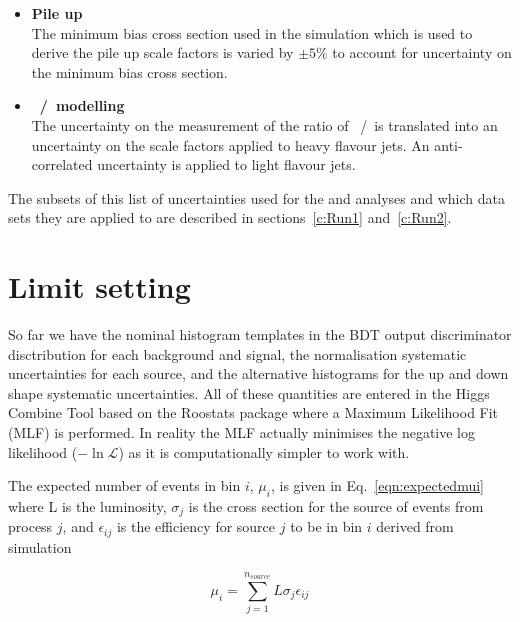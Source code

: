 \begin{itemize}
\item \textbf{Pile up}\\
The minimum bias cross section used in the simulation which is used to derive the pile up scale factors is varied by $\pm 5\%$ to account for uncertainty on the minimum bias cross section. 

\item \textbf{\heavyflavourone~/~\heavyflavourtwo modelling}\\
The uncertainty on the measurement of the ratio of \heavyflavourone~/~\heavyflavourtwo is translated into an uncertainty on the scale factors applied to heavy flavour jets. An anti-correlated uncertainty is applied to light flavour jets.

\end{itemize}

The subsets of this list of uncertainties used for the \runone and \runtwo analyses and which data sets they are applied to are described in sections~\ref{c:Run1} and~\ref{c:Run2}. 


\section{Limit setting \label{sec:limitFit}}
So far we have the nominal histogram templates in the BDT output discriminator disctribution for each background and signal, the normalisation systematic uncertainties for each source, and the alternative histograms for the up and down shape systematic uncertainties. All of these quantities are entered in the Higgs Combine Tool based on the Roostats package where a Maximum Likelihood Fit (MLF) is performed. In reality the MLF actually minimises the negative log likelihood ($-\ln\mathcal{L}$) as it is computationally simpler to work with.

The expected number of events in bin $i$, $\mu_{i}$, is given in Eq.~\ref{eqn:expectedmui} where L is the luminosity, $\sigma_{j}$ is the cross section for the source of events from process $j$, and $\epsilon_{ij}$ is the efficiency for source $j$ to be in bin $i$ derived from simulation

\begin{equation}
\mu_{i} = \sum_{j=1}^{n_{source}}L\sigma_{j}\epsilon_{ij}
\label{eqn:expectedmui}
\end{equation}

